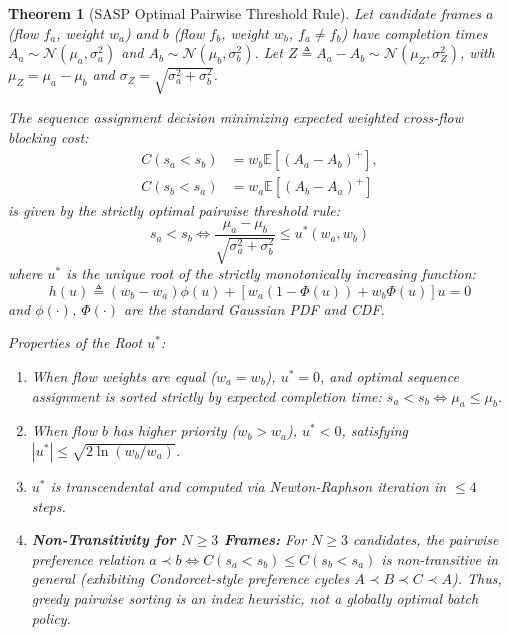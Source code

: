 \documentclass[10pt,journal,compsoc]{IEEEtran}
\newtheorem{theorem}{Theorem}
\begin{document}
\begin{theorem}[SASP Optimal Pairwise Threshold Rule]
\label{thm:sasp}
Let candidate frames $a$ (flow $f_a$, weight $w_a$) and $b$ (flow $f_b$, weight $w_b$, $f_a \ne f_b$) have completion times $A_a \sim \mathcal{N}(\mu_a, \sigma_a^2)$ and $A_b \sim \mathcal{N}(\mu_b, \sigma_b^2)$. Let $Z \triangleq A_a - A_b \sim \mathcal{N}(\mu_Z, \sigma_Z^2)$, with $\mu_Z = \mu_a - \mu_b$ and $\sigma_Z = \sqrt{\sigma_a^2 + \sigma_b^2}$.

The sequence assignment decision minimizing expected weighted cross-flow blocking cost:
\begin{align}
    C(s_a < s_b) &= w_b \mathbb{E}[(A_a - A_b)^+], \nonumber \\
    C(s_b < s_a) &= w_a \mathbb{E}[(A_b - A_a)^+]
\end{align}
is given by the strictly optimal pairwise threshold rule:
\begin{equation}
    s_a < s_b \iff \frac{\mu_a - \mu_b}{\sqrt{\sigma_a^2 + \sigma_b^2}} \le u^*(w_a, w_b)
\end{equation}
where $u^*$ is the unique root of the strictly monotonically increasing function:
\begin{equation}
    h(u) \triangleq (w_b - w_a) \phi(u) + \left[ w_a(1 - \Phi(u)) + w_b\Phi(u) \right] u = 0
\end{equation}
and $\phi(\cdot)$, $\Phi(\cdot)$ are the standard Gaussian PDF and CDF.

Properties of the Root $u^*$:
\begin{enumerate}
    \item When flow weights are equal ($w_a = w_b$), $u^* = 0$, and optimal sequence assignment is sorted strictly by expected completion time: $s_a < s_b \iff \mu_a \le \mu_b$.
    \item When flow $b$ has higher priority ($w_b > w_a$), $u^* < 0$, satisfying $|u^*| \le \sqrt{2 \ln(w_b / w_a)}$.
    \item $u^*$ is transcendental and computed via Newton-Raphson iteration in $\le 4$ steps.
    \item \textbf{Non-Transitivity for $N \ge 3$ Frames:} For $N \ge 3$ candidates, the pairwise preference relation $a \prec b \iff C(s_a < s_b) \le C(s_b < s_a)$ is non-transitive in general (exhibiting Condorcet-style preference cycles $A \prec B \prec C \prec A$). Thus, greedy pairwise sorting is an index heuristic, not a globally optimal batch policy.
\end{enumerate}
\end{theorem}
\end{document}
